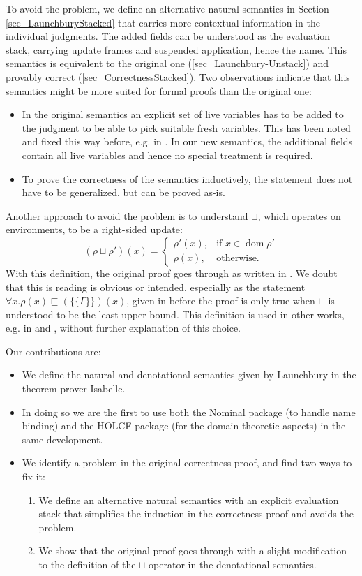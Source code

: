 \documentclass[11pt,a4paper,parskip=half]{scrartcl}
\begin{document}
To avoid the problem, we define an alternative natural semantics in Section \ref{sec_LaunchburyStacked} that carries more contextual information in the individual judgments. The added fields can be understood as the evaluation stack, carrying update frames and suspended application, hence the name. This semantics is equivalent to the original one (\ref{sec_Launchbury-Unstack}) and provably correct (\ref{sec_CorrectnessStacked}). Two observations indicate that this semantics might be more suited for formal proofs than the original one:
\begin{itemize}
\item In the original semantics an explicit set of live variables has to be added to the judgment to be able to pick suitable fresh variables. This has been noted and fixed this way before, e.g. in \cite{sestoft}. In our new semantics, the additional fields contain all live variables and hence no special treatment is required.
\item To prove the correctness of the semantics inductively, the statement does not have to be generalized, but can be proved as-is.
\end{itemize}

Another approach to avoid the problem is to understand $\sqcup$, which operates on environments, to be a right-sided update:
\[
(\rho \sqcup \rho')(x) = 
\begin{cases}
\rho'(x), &\text{if } x \in \operatorname{dom} \rho' \\
\rho(x), &\text{otherwise.}
\end{cases}
\]
With this definition, the original proof goes through as written in \cite{launchbury}. We doubt that this is reading is obvious or intended, especially as the statement $\forall x. \rho(x) \sqsubseteq (\{\!\!\{\Gamma\}\!\!\})(x)$, given in \cite{launchbury} before the proof is only true when $\sqcup$ is understood to be the least upper bound. This definition is used in other works, e.g. in \cite{parallel} and \cite{nakata_blackhole}, without further explanation of this choice.

Our contributions are:
 
\begin{itemize}
\item We define the natural and denotational semantics given by Launchbury in the theorem prover Isabelle.
\item In doing so we are the first to use both the Nominal package (to handle name binding) \cite{nominal} and the HOLCF \cite{holcf} package (for the domain-theoretic aspects) in the same development.
\item We identify a problem in the original correctness proof, and find two ways to fix it:
\begin{enumerate}
\item We define an alternative natural semantics with an explicit evaluation stack that simplifies the induction in the correctness proof and avoids the problem.
\item We show that the original proof goes through with a slight modification to the definition of the $\sqcup$-operator in the denotational semantics.
\end{enumerate}
\end{itemize}
\end{document}
